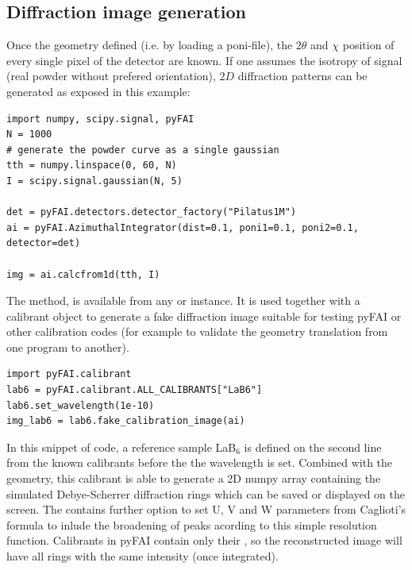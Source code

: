 \documentclass[preprint]{iucr}
\begin{document}
\subsection{Diffraction image generation}

Once the geometry defined (i.e. by loading a poni-file), the $2\theta$ and
$\chi$ position of every single pixel of the detector are known.
If one assumes the isotropy of signal (real powder without prefered
orientation), $2D$ diffraction patterns can be generated as exposed in this
example:

\begin{verbatim}
import numpy, scipy.signal, pyFAI
N = 1000
# generate the powder curve as a single gaussian  
tth = numpy.linspace(0, 60, N)
I = scipy.signal.gaussian(N, 5)

det = pyFAI.detectors.detector_factory("Pilatus1M")
ai = pyFAI.AzimuthalIntegrator(dist=0.1, poni1=0.1, poni2=0.1, detector=det)

img = ai.calcfrom1d(tth, I)
\end{verbatim}


The method,  is available from any
 or  instance. 
It is used together with a calibrant object to generate a fake diffraction image
suitable for testing pyFAI or other calibration codes (for example to validate 
the geometry translation from one program to another).


\begin{verbatim}
import pyFAI.calibrant
lab6 = pyFAI.calibrant.ALL_CALIBRANTS["LaB6"]
lab6.set_wavelength(1e-10)
img_lab6 = lab6.fake_calibration_image(ai)
\end{verbatim}

In this snippet of code, a reference sample LaB$_6$ is defined on the second
line from the known calibrants before the the wavelength is set.
Combined with the geometry, this calibrant is able to 
generate a 2D numpy array containing the simulated Debye-Scherrer diffraction
rings which can be saved or displayed on the screen.
The  contains further option to set U, V and W
parameters from Caglioti's formula \cite{caglioti} to inlude the
broadening of peaks acording to this simple resolution function. 
Calibrants in pyFAI contain only their , so the
reconstructed image will have all rings with the same
intensity (once integrated).
\end{document}
